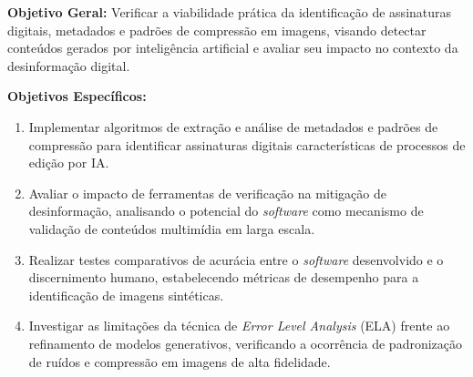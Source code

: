 \noindent\textbf{Objetivo Geral:} Verificar a viabilidade prática da
identificação de assinaturas digitais, metadados e padrões de compressão em
imagens, visando detectar conteúdos gerados por inteligência artificial e avaliar
seu impacto no contexto da desinformação digital.

\vspace{4mm}
\noindent\textbf{Objetivos Específicos:}
\begin{enumerate}[label=\arabic*~--,leftmargin=1.5cm,itemsep=4pt]
  \item Implementar algoritmos de extração e análise de metadados e padrões de
        compressão para identificar assinaturas digitais características de
        processos de edição por IA.
  \item Avaliar o impacto de ferramentas de verificação na mitigação de
        desinformação, analisando o potencial do \textit{software} como mecanismo
        de validação de conteúdos multimídia em larga escala.
  \item Realizar testes comparativos de acurácia entre o \textit{software}
        desenvolvido e o discernimento humano, estabelecendo métricas de
        desempenho para a identificação de imagens sintéticas.
  \item Investigar as limitações da técnica de \textit{Error Level Analysis}
        (ELA) frente ao refinamento de modelos generativos, verificando a
        ocorrência de padronização de ruídos e compressão em imagens de alta
        fidelidade.
\end{enumerate}

